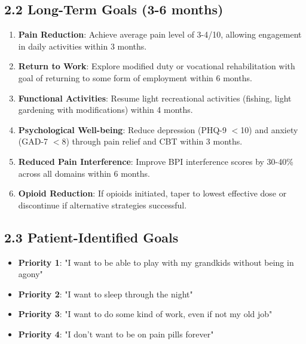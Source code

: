 \documentclass[11pt,letterpaper]{article}
\begin{document}
\subsection*{2.2 Long-Term Goals (3-6 months)}

\begin{enumerate}[leftmargin=*]
    \item \textbf{Pain Reduction}: Achieve average pain level of 3-4/10, allowing engagement in daily activities within 3 months.

    \item \textbf{Return to Work}: Explore modified duty or vocational rehabilitation with goal of returning to some form of employment within 6 months.

    \item \textbf{Functional Activities}: Resume light recreational activities (fishing, light gardening with modifications) within 4 months.

    \item \textbf{Psychological Well-being}: Reduce depression (PHQ-9 $<$10) and anxiety (GAD-7 $<$8) through pain relief and CBT within 3 months.

    \item \textbf{Reduced Pain Interference}: Improve BPI interference scores by 30-40\% across all domains within 6 months.

    \item \textbf{Opioid Reduction}: If opioids initiated, taper to lowest effective dose or discontinue if alternative strategies successful.
\end{enumerate}

\subsection*{2.3 Patient-Identified Goals}

\begin{itemize}[leftmargin=*]
    \item \textbf{Priority 1}: "I want to be able to play with my grandkids without being in agony"
    \item \textbf{Priority 2}: "I want to sleep through the night"
    \item \textbf{Priority 3}: "I want to do some kind of work, even if not my old job"
    \item \textbf{Priority 4}: "I don't want to be on pain pills forever"
\end{itemize}
\end{document}
